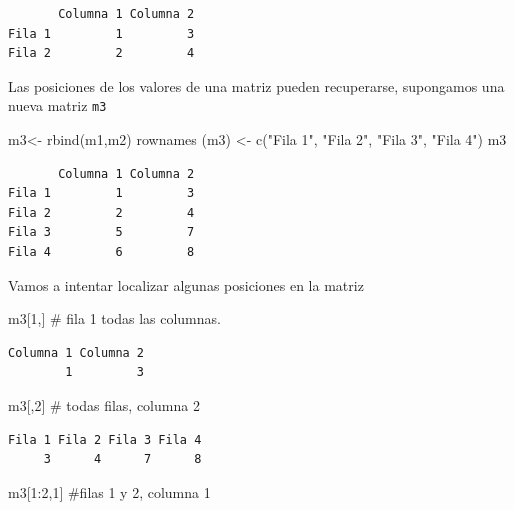 \documentclass[
  letterpaper,
  DIV=11,
  numbers=noendperiod]{scrreprt}
\newenvironment{Shaded}{\begin{snugshade}}{\end{snugshade}}
\newcommand{\CommentTok}[1]{\textcolor[rgb]{0.37,0.37,0.37}{#1}}
\newcommand{\DecValTok}[1]{\textcolor[rgb]{0.68,0.00,0.00}{#1}}
\newcommand{\FunctionTok}[1]{\textcolor[rgb]{0.28,0.35,0.67}{#1}}
\newcommand{\NormalTok}[1]{\textcolor[rgb]{0.00,0.23,0.31}{#1}}
\newcommand{\OtherTok}[1]{\textcolor[rgb]{0.00,0.23,0.31}{#1}}
\newcommand{\SpecialCharTok}[1]{\textcolor[rgb]{0.37,0.37,0.37}{#1}}
\newcommand{\StringTok}[1]{\textcolor[rgb]{0.13,0.47,0.30}{#1}}
\begin{document}
\begin{verbatim}
       Columna 1 Columna 2
Fila 1         1         3
Fila 2         2         4
\end{verbatim}

Las posiciones de los valores de una matriz pueden recuperarse,
supongamos una nueva matriz \texttt{m3}

\begin{Shaded}
\begin{Highlighting}[]
\NormalTok{m3}\OtherTok{\textless{}{-}} \FunctionTok{rbind}\NormalTok{(m1,m2)}
\FunctionTok{rownames}\NormalTok{ (m3) }\OtherTok{\textless{}{-}} \FunctionTok{c}\NormalTok{(}\StringTok{"Fila 1"}\NormalTok{, }\StringTok{"Fila 2"}\NormalTok{, }\StringTok{"Fila 3"}\NormalTok{, }\StringTok{"Fila 4"}\NormalTok{)}
\NormalTok{m3}
\end{Highlighting}
\end{Shaded}

\begin{verbatim}
       Columna 1 Columna 2
Fila 1         1         3
Fila 2         2         4
Fila 3         5         7
Fila 4         6         8
\end{verbatim}

Vamos a intentar localizar algunas posiciones en la matriz

\begin{Shaded}
\begin{Highlighting}[]
\NormalTok{m3[}\DecValTok{1}\NormalTok{,] }\CommentTok{\# fila 1 todas las columnas.}
\end{Highlighting}
\end{Shaded}

\begin{verbatim}
Columna 1 Columna 2 
        1         3 
\end{verbatim}

\begin{Shaded}
\begin{Highlighting}[]
\NormalTok{m3[,}\DecValTok{2}\NormalTok{] }\CommentTok{\# todas filas, columna 2}
\end{Highlighting}
\end{Shaded}

\begin{verbatim}
Fila 1 Fila 2 Fila 3 Fila 4 
     3      4      7      8 
\end{verbatim}

\begin{Shaded}
\begin{Highlighting}[]
\NormalTok{m3[}\DecValTok{1}\SpecialCharTok{:}\DecValTok{2}\NormalTok{,}\DecValTok{1}\NormalTok{] }\CommentTok{\#filas 1 y 2,  columna 1 }
\end{Highlighting}
\end{Shaded}
\end{document}
